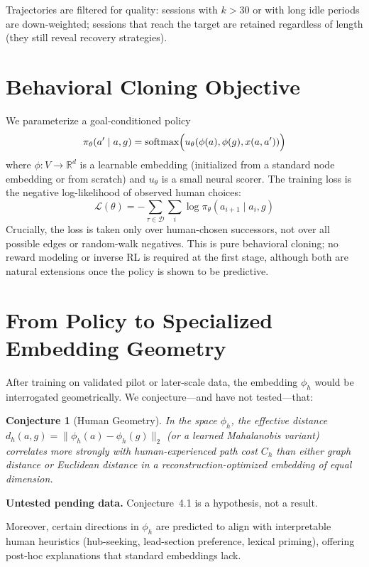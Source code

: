 \documentclass[11pt,a4paper]{report}
\newtheorem{conjecture}{Conjecture}[chapter]
\begin{document}
Trajectories are filtered for quality: sessions with \(k > 30\) or with long idle periods are down-weighted; sessions that reach the target are retained regardless of length (they still reveal recovery strategies).

\section{Behavioral Cloning Objective}

We parameterize a goal-conditioned policy
\[
\pi_\theta(a' \mid a, g) = \text{softmax}\Bigl( u_\theta(\phi(a), \phi(g), x(a,a')) \Bigr)
\]
where \(\phi: V \to \mathbb{R}^d\) is a learnable embedding (initialized from a standard node embedding or from scratch) and \(u_\theta\) is a small neural scorer. The training loss is the negative log-likelihood of observed human choices:
\[
\mathcal{L}(\theta) = -\sum_{\tau \in \mathcal{D}} \sum_{i} \log \pi_\theta(a_{i+1} \mid a_i, g)
\]
Crucially, the loss is taken only over human-chosen successors, not over all possible edges or random-walk negatives. This is pure behavioral cloning; no reward modeling or inverse RL is required at the first stage, although both are natural extensions once the policy is shown to be predictive.

\section{From Policy to Specialized Embedding Geometry}

After training on validated pilot or later-scale data, the embedding \(\phi_h\) would be interrogated geometrically. We conjecture---and have not tested---that:

\begin{conjecture}[Human Geometry]
In the space \(\phi_h\), the effective distance \(d_h(a, g) = \|\phi_h(a) - \phi_h(g)\|_2\) (or a learned Mahalanobis variant) correlates more strongly with human-experienced path cost \(C_h\) than either graph distance or Euclidean distance in a reconstruction-optimized embedding of equal dimension.
\end{conjecture}

\noindent\textbf{Untested pending data.} Conjecture~4.1 is a hypothesis, not a result.

Moreover, certain directions in \(\phi_h\) are predicted to align with interpretable human heuristics (hub-seeking, lead-section preference, lexical priming), offering post-hoc explanations that standard embeddings lack.
\end{document}
